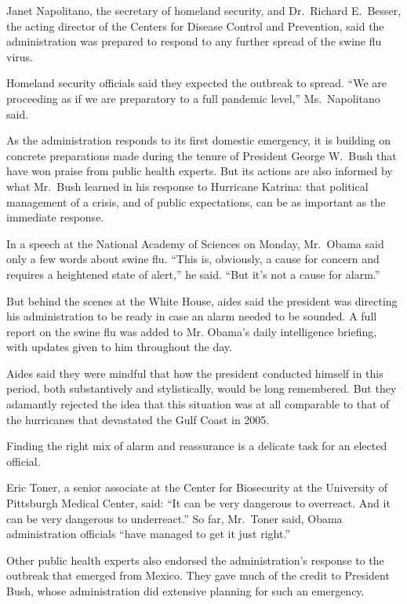 \documentclass[12pt,a4paper,onecolumn]{article}
\begin{document}
Janet Napolitano, the secretary of homeland security, and Dr.~Richard E.~Besser, the acting director
of the Centers for Disease Control and Prevention, said the administration was prepared to respond
to any further spread of the swine flu virus.

Homeland security officials said they expected the outbreak to spread. ``We are proceeding as if we
are preparatory to a full pandemic level,'' Ms.~Napolitano said.

As the administration responds to its first domestic emergency, it is building on concrete
preparations made during the tenure of President George W.~Bush that have won praise from public
health experts. But its actions are also informed by what Mr.~Bush learned in his response to
Hurricane Katrina: that political management of a crisis, and of public expectations, can be as
important as the immediate response.

In a speech at the National Academy of Sciences on Monday, Mr.~Obama said only a few words about
swine flu. ``This is, obviously, a cause for concern and requires a heightened state of alert,'' he
said. ``But it's not a cause for alarm.''

But behind the scenes at the White House, aides said the president was directing his administration
to be ready in case an alarm needed to be sounded. A full report on the swine flu was added to Mr.
Obama's daily intelligence briefing, with updates given to him throughout the day.

Aides said they were mindful that how the president conducted himself in this period, both
substantively and stylistically, would be long remembered. But they adamantly rejected the idea that
this situation was at all comparable to that of the hurricanes that devastated the Gulf Coast in
2005.

Finding the right mix of alarm and reassurance is a delicate task for an elected official.

Eric Toner, a senior associate at the Center for Biosecurity at the University of Pittsburgh Medical
Center, said: ``It can be very dangerous to overreact. And it can be very dangerous to underreact.''
So far, Mr.~Toner said, Obama administration officials ``have managed to get it just right.''

Other public health experts also endorsed the administration's response to the outbreak that emerged
from Mexico. They gave much of the credit to President Bush, whose administration did extensive
planning for such an emergency.
\end{document}
